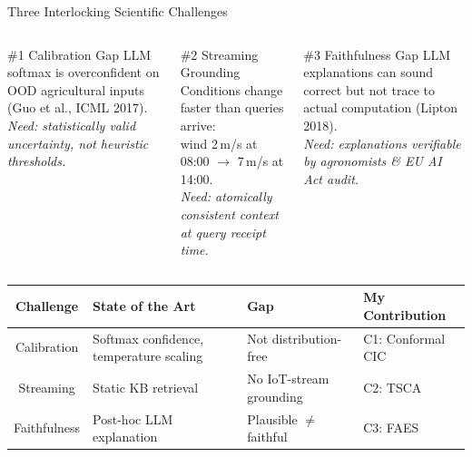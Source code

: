 \documentclass[aspectratio=169,10pt]{beamer}
\begin{document}
\begin{frame}{Three Interlocking Scientific Challenges}

\begin{columns}[T]
\begin{block}{\#1 Calibration Gap}
LLM softmax is overconfident on OOD agricultural inputs (Guo et al., ICML 2017).\\[4pt]
\textit{Need: statistically valid uncertainty, not heuristic thresholds.}
\end{block}

\begin{block}{\#2 Streaming Grounding}
Conditions change faster than queries arrive:\\
wind 2\,m/s at 08:00 $\to$ 7\,m/s at 14:00.\\[4pt]
\textit{Need: atomically consistent context at query receipt time.}
\end{block}

\begin{block}{\#3 Faithfulness Gap}
LLM explanations can sound correct but not trace to actual computation (Lipton 2018).\\[4pt]
\textit{Need: explanations verifiable by agronomists \& EU AI Act audit.}
\end{block}
\end{columns}

\bigskip
\begin{center}
\small
\begin{tabular}{@{}clll@{}}
\toprule
\textbf{Challenge} & \textbf{State of the Art} & \textbf{Gap} & \textbf{My Contribution} \\
\midrule
Calibration & Softmax confidence, temperature scaling & Not distribution-free & C1: Conformal CIC \\
Streaming & Static KB retrieval & No IoT-stream grounding & C2: TSCA \\
Faithfulness & Post-hoc LLM explanation & Plausible $\neq$ faithful & C3: FAES \\
\bottomrule
\end{tabular}
\end{center}

\end{frame}
\end{document}

